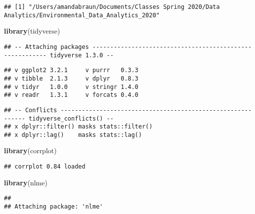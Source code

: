 \documentclass[]{article}
\newenvironment{Shaded}{\begin{snugshade}}{\end{snugshade}}
\newcommand{\CommentTok}[1]{\textcolor[rgb]{0.56,0.35,0.01}{\textit{#1}}}
\newcommand{\KeywordTok}[1]{\textcolor[rgb]{0.13,0.29,0.53}{\textbf{#1}}}
\newcommand{\NormalTok}[1]{#1}
\begin{document}
\begin{Shaded}
\end{Shaded}

\begin{verbatim}
## [1] "/Users/amandabraun/Documents/Classes Spring 2020/Data Analytics/Environmental_Data_Analytics_2020"
\end{verbatim}

\begin{Shaded}
\begin{Highlighting}[]
\KeywordTok{library}\NormalTok{(tidyverse)}
\end{Highlighting}
\end{Shaded}

\begin{verbatim}
## -- Attaching packages --------------------------------------------------------- tidyverse 1.3.0 --
\end{verbatim}

\begin{verbatim}
## v ggplot2 3.2.1     v purrr   0.3.3
## v tibble  2.1.3     v dplyr   0.8.3
## v tidyr   1.0.0     v stringr 1.4.0
## v readr   1.3.1     v forcats 0.4.0
\end{verbatim}

\begin{verbatim}
## -- Conflicts ------------------------------------------------------------ tidyverse_conflicts() --
## x dplyr::filter() masks stats::filter()
## x dplyr::lag()    masks stats::lag()
\end{verbatim}

\begin{Shaded}
\begin{Highlighting}[]
\KeywordTok{library}\NormalTok{(corrplot)}
\end{Highlighting}
\end{Shaded}

\begin{verbatim}
## corrplot 0.84 loaded
\end{verbatim}

\begin{Shaded}
\begin{Highlighting}[]
\KeywordTok{library}\NormalTok{(nlme)}
\end{Highlighting}
\end{Shaded}

\begin{verbatim}
## 
## Attaching package: 'nlme'
\end{verbatim}
\end{document}
